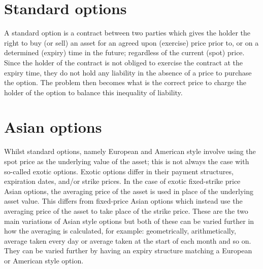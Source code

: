 

\section{Standard options}

A standard option is a contract between two parties which gives the holder the right to buy (or sell) an asset for an agreed upon (exercise) price prior to, or on a determined (expiry) time in the future; regardless of the current (spot) price. Since the holder of the contract is not obliged to exercise the contract at the expiry time, they do not hold any liability in the absence of a price to purchase the option. The problem then becomes what is the correct price to charge the holder of the option to balance this inequality of liability. 

\section{Asian options}

Whilst standard options, namely European and American style involve using the spot price as the underlying value of the asset; this is not always the case with so-called exotic options. Exotic options differ in their payment structures, expiration dates, and/or strike prices. In the case of exotic fixed-strike price Asian options, the averaging price of the asset is used in place of the underlying asset value. This differs from fixed-price Asian options which instead use the averaging price of the asset to take place of the strike price. These are the two main variations of Asian style options but both of these can be varied further in how the averaging is calculated, for example: geometrically, arithmetically, average taken every day or average taken at the start of each month and so on. They can be varied further by having an expiry structure matching a European or American style option.